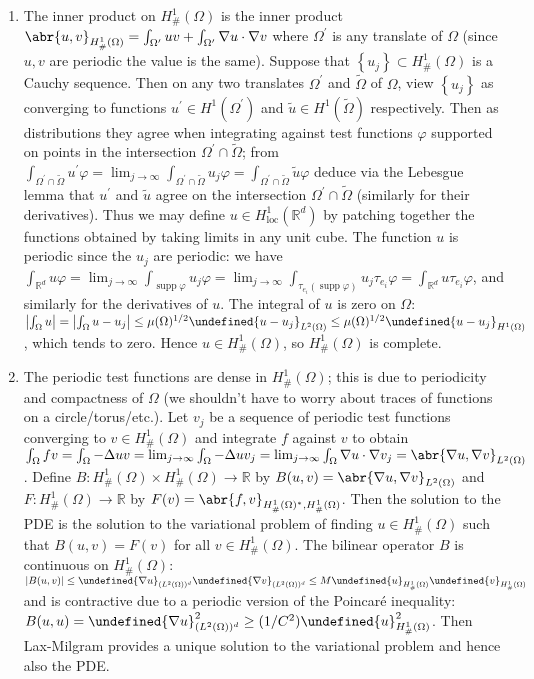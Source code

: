 \documentclass[11pt,leqno]{article}
\theoremstyle{plain}
\theoremstyle{definition}
\numberwithin{equation}{section}
\numberwithin{lem}{section}
\newcommand{\cbr}[1]{\left\{#1\right\}}
\DeclareMathOperator{\supp}{supp}
\let\norm\undefined %
\DeclarePairedDelimiter\norm{\lVert}{\rVert}
\begin{document}
\begin{enumerate}
\begin{enumerate}
        \item The inner product on $H^1_\#(\Omega)$ is the inner product $\abr{u,v}_{H^1_\#(\Omega)} = \int_{\Omega^\prime}uv + \int_{\Omega^\prime}\nabla u\cdot \nabla v$ where $\Omega^\prime$ is any translate of $\Omega$ (since $u,v$ are periodic the value is the same). Suppose that $\cbr{u_j}\subset H^1_\#(\Omega)$ is a Cauchy sequence. Then on any two translates $\Omega^\prime$ and $\widetilde \Omega$ of $\Omega$, view $\cbr{u_j}$ as converging to functions $u^\prime\in H^1(\Omega^\prime)$ and $\tilde u\in H^1(\widetilde \Omega)$ respectively. Then as distributions they agree when integrating against test functions $\varphi$ supported on points in the intersection $\Omega^\prime\cap \widetilde\Omega$; from $\int_{\Omega^\prime\cap \widetilde\Omega}u^\prime\varphi = \lim_{j\to\infty}\int_{\Omega^\prime\cap \widetilde\Omega}u_j\varphi = \int_{\Omega^\prime\cap \widetilde\Omega}\widetilde u\varphi$ deduce via the Lebesgue lemma that $u^\prime$ and $\tilde u$ agree on the intersection $\Omega^\prime\cap \widetilde\Omega$ (similarly for their derivatives). Thus we may define $u\in H^1_{\text{loc}}(\mathbb R^d)$ by patching together the functions obtained by taking limits in any unit cube. The function $u$ is periodic since the $u_j$ are periodic: we have $\int_{\mathbb R^d}u\varphi = \lim_{j\to\infty}\int_{\supp\varphi}u_j\varphi = \lim_{j\to\infty}\int_{\tau_{e_i}(\supp\varphi)}u_j\tau_{e_i}\varphi = \int_{\mathbb R^d}u\tau_{e_i}\varphi$, and similarly for the derivatives of $u$. The integral of $u$ is zero on $\Omega$: $\abs{\int_\Omega u} = \abs{\int_\Omega u-u_j} \leq \mu(\Omega)^{1/2}\norm{u-u_j}_{L^2(\Omega)}\leq \mu(\Omega)^{1/2}\norm{u-u_j}_{H^1(\Omega)}$, which tends to zero. Hence $u\in H^1_\#(\Omega)$, so $H^1_\#(\Omega)$ is complete.
        \item The periodic test functions are dense in $H^1_\#(\Omega)$; this is due to periodicity and compactness of $\Omega$ (we shouldn't have to worry about traces of functions on a circle/torus/etc.). Let $v_j$ be a sequence of periodic test functions converging to $v\in H^1_\#(\Omega)$ and integrate $f$ against $v$ to obtain $\int_\Omega fv = \int_\Omega-\Delta u v = \lim_{j\to\infty}\int_\Omega-\Delta u v_j = \lim_{j\to\infty}\int_\Omega\nabla u\cdot \nabla v_j = \abr{\nabla u,\nabla v}_{L^2(\Omega)}$. Define $B\colon H^1_\#(\Omega)\times H^1_\#(\Omega)\to\mathbb R$ by $B(u,v) = \abr{\nabla u,\nabla v}_{L^2(\Omega)}$ and $F\colon H^1_\#(\Omega)\to \mathbb R$ by $F(v) = \abr{f,v}_{H^1_\#(\Omega)^\ast,H^1_\#(\Omega)}$. Then the solution to the PDE is the solution to the variational problem of finding $u\in H^1_\#(\Omega)$ such that $B(u,v) = F(v)$ for all $v\in H^1_\#(\Omega)$. The bilinear operator $B$ is continuous on $H^1_\#(\Omega)$: $\abs{B(u,v)}\leq \norm{\nabla u}_{(L^2(\Omega))^d}\norm{\nabla v}_{(L^2(\Omega))^d}\leq M\norm{u}_{H^1_\#(\Omega)}\norm{v}_{H^1_\#(\Omega)}$ and is contractive due to a periodic version of the Poincar\'e inequality: $B(u,u) = \norm{\nabla u}_{(L^2(\Omega))^d}^2\geq (1/C^2)\norm{u}_{H^1_\#(\Omega)}^2$. Then Lax-Milgram provides a unique solution to the variational problem and hence also the PDE.
        

\end{enumerate}
\end{enumerate}
\end{document}
